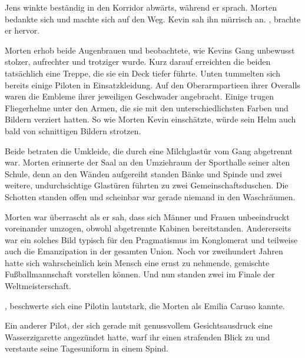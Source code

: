 \par

Jens winkte beständig in den Korridor abwärts, während er sprach. Morten bedankte sich und machte sich auf den Weg. Kevin sah ihn mürrisch an. , brachte er hervor.

\par

Morten erhob beide Augenbrauen und beobachtete, wie Kevins Gang unbewusst stolzer, aufrechter und trotziger wurde. Kurz darauf erreichten die beiden tatsächlich eine Treppe, die sie ein Deck tiefer führte. Unten tummelten sich bereits einige Piloten in Einsatzkleidung. Auf den Oberarmpartieen ihrer Overalls waren die Embleme ihrer jeweiligen Geschwader angebracht. Einige trugen Fliegerhelme unter den Armen, die sie mit den unterschiedlichsten Farben und Bildern verziert hatten. So wie Morten Kevin einschätzte, würde sein Helm auch bald von schnittigen Bildern strotzen.

\par

Beide betraten die Umkleide, die durch eine Milchglastür vom Gang abgetrennt war. Morten erinnerte der Saal an den Umziehraum der Sporthalle seiner alten Schule, denn an den Wänden aufgereiht standen Bänke und Spinde und zwei weitere, undurchsichtige Glastüren führten zu zwei Gemeinschaftsduschen. Die Schotten standen offen und scheinbar war gerade niemand in den Waschräumen.

\par

Morten war überrascht als er sah, dass sich Männer und Frauen unbeeindruckt voreinander umzogen, obwohl abgetrennte Kabinen bereitstanden. Andererseits war ein solches Bild typisch für den Pragmatismus im Konglomerat und teilweise auch die Emanzipation in der gesamten Union. Noch vor zweihundert Jahren hatte sich wahrscheinlich kein Mensch eine ernst zu nehmende, gemischte Fußballmannschaft vorstellen können. Und nun standen zwei im Finale der Weltmeisterschaft.

\par

, beschwerte sich eine Pilotin lautstark, die Morten als Emilia Caruso kannte. 

\par

Ein anderer Pilot, der sich gerade mit genussvollem Gesichtsausdruck eine Wasserzigarette angezündet hatte, warf ihr einen strafenden Blick zu und verstaute seine Tagesuniform in einem Spind.

